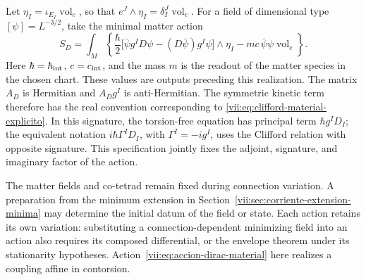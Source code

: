 Let \(\eta_I=\iota_{E_I}\operatorname{vol}_e\), so that
\(e^J\wedge\eta_I=\delta_I^J\operatorname{vol}_e\). For a
field of dimensional type \([\psi]=L^{-3/2}\), take the minimal
matter action
\begin{equation}
 S_D=\int_M\left\{
 \frac{\hbar}{2}
 \bigl[\bar\psi g^I D\psi-(D\bar\psi)g^I\psi\bigr]\wedge\eta_I
 -mc\,\bar\psi\psi\operatorname{vol}_e\right\}.
 \label{vii:eq:accion-dirac-material}
\end{equation}
Here \(\hbar=\hbar_{\rm int}\), \(c=c_{\rm int}\), and
the mass \(m\) is the readout of the matter species in the chosen
chart. These values are outputs preceding this realization. The matrix
\(A_D\) is Hermitian and \(A_Dg^I\) is anti-Hermitian. The
symmetric kinetic term therefore has the real convention corresponding
to \eqref{vii:eq:clifford-material-explicito}. In this signature,
the torsion-free equation has principal term \(\hbar g^I D_I\);
the equivalent notation \(i\hbar\Gamma^I D_I\), with \(\Gamma^I=-i g^I\),
uses the Clifford relation with opposite signature. This specification
jointly fixes the adjoint, signature, and imaginary factor of the action.

The matter fields and co-tetrad remain fixed during connection
variation. A preparation from the minimum extension in
Section~\ref{vii:sec:corriente-extension-minima} may determine
the initial datum of the field or state. Each action retains its
own variation: substituting a connection-dependent minimizing field
into an action also requires its composed differential, or the
envelope theorem under its stationarity hypotheses.
Action~\eqref{vii:eq:accion-dirac-material} here realizes a
coupling affine in contorsion.

